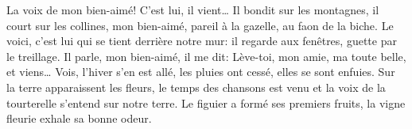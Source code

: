 La voix de mon bien-aimé! C’est lui, il vient…
	Il bondit sur les montagnes, il court sur les collines, mon bien-aimé,
	pareil à la gazelle, au faon de la biche.
Le voici, c’est lui qui se tient derrière notre mur:
	il regarde aux fenêtres, guette par le treillage.
Il parle, mon bien-aimé, il me dit:
	Lève-toi, mon amie, ma toute belle, et viens…
	Vois, l’hiver s’en est allé, les pluies ont cessé, elles se sont enfuies.
Sur la terre apparaissent les fleurs, le temps des chansons est venu
	et la voix de la tourterelle s’entend sur notre terre.
Le figuier a formé ses premiers fruits, la vigne fleurie exhale sa bonne odeur.

